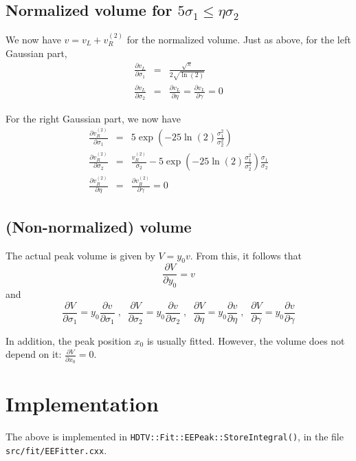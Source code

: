 \documentclass[a4paper]{article}
\newcommand{\D}[2]{\frac{\partial #1}{\partial #2}}
\begin{document}
\subsection{Normalized volume for $5\sigma_1 \le \eta\sigma_2$}
We now have $v = v_L + v_R^{(2)}$ for the normalized volume. Just as above, for the left Gaussian part,
\begin{eqnarray}
\D{v_L}{\sigma_1} &=& \frac{\sqrt{\pi}}{2 \sqrt{\ln(2)}}\\
\D{v_L}{\sigma_2} &=& \D{v_L}{\eta} = \D{v_L}{\gamma} = 0
\end{eqnarray}

For the right Gaussian part, we now have
\begin{eqnarray}
\D{v_R^{(2)}}{\sigma_1} &=& 5 \exp\left(-25 \ln(2) \frac{\sigma_1^2}{\sigma_2^2}\right)\\
\D{v_R^{(2)}}{\sigma_2} &=& \frac{v_R^{(2)}}{\sigma_2} - 5 \exp\left(-25 \ln(2) \frac{\sigma_1^2}{\sigma_2^2}\right) \frac{\sigma_1}{\sigma_2}\\
\D{v_R^{(2)}}{\eta} &=& \D{v_R^{(2)}}{\gamma} = 0
\end{eqnarray}

\subsection{(Non-normalized) volume}
The actual peak volume is given by $V = y_0 v$. From this, it follows that
\begin{equation}
\D{V}{y_0} = v
\end{equation}
and
\begin{equation}
\D{V}{\sigma_1} = y_0 \D{v}{\sigma_1}\;,\;\;
\D{V}{\sigma_2} = y_0 \D{v}{\sigma_2}\;,\;\;
\D{V}{\eta} = y_0 \D{v}{\eta}\;,\;\;
\D{V}{\gamma} = y_0 \D{v}{\gamma}
\end{equation}

In addition, the peak position $x_0$ is usually fitted. However, the volume does not depend on it: $\D{V}{x_0} = 0$.

\section{Implementation}
The above is implemented in \texttt{HDTV::Fit::EEPeak::StoreIntegral()}, in the file \texttt{src/fit/EEFitter.cxx}.
\end{document}
